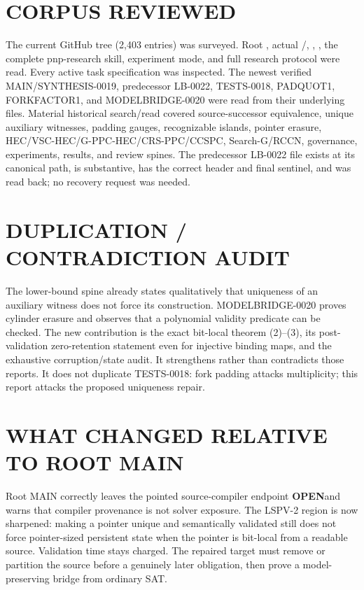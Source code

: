 \documentclass[11pt]{article}
\newcommand{\OPEN}{\textbf{OPEN}}
\begin{document}
\section{CORPUS REVIEWED}

The current GitHub tree (2,403 entries) was surveyed.  Root ,
actual /, ,
, the complete pnp-research skill, experiment mode, and full
research protocol were read.  Every active task specification was inspected.
The newest verified MAIN/SYNTHESIS-0019, predecessor LB-0022, TESTS-0018,
PADQUOT1, FORKFACTOR1, and MODELBRIDGE-0020 were read from their underlying
files.  Material historical search/read covered source-successor equivalence,
unique auxiliary witnesses, padding gauges, recognizable islands, pointer
erasure, HEC/VSC-HEC/G-PPC-HEC/CRS-PPC/CCSPC, Search-G/RCCN, governance,
experiments, results, and review spines.  The predecessor LB-0022 file exists
at its canonical path, is substantive, has the correct header and final
sentinel, and was read back; no recovery request was needed.

\section{DUPLICATION / CONTRADICTION AUDIT}

The lower-bound spine already states qualitatively that uniqueness of an
auxiliary witness does not force its construction.  MODELBRIDGE-0020 proves
cylinder erasure and observes that a polynomial validity predicate can be
checked.  The new contribution is the exact bit-local theorem (2)--(3), its
post-validation zero-retention statement even for injective binding maps, and
the exhaustive corruption/state audit.  It strengthens rather than
contradicts those reports.  It does not duplicate TESTS-0018: fork padding
attacks multiplicity; this report attacks the proposed uniqueness repair.

\section{WHAT CHANGED RELATIVE TO ROOT MAIN}

Root MAIN correctly leaves the pointed source-compiler endpoint \OPEN and
warns that compiler provenance is not solver exposure.  The LSPV-2 region is
now sharpened: making a pointer unique and semantically validated still does
not force pointer-sized persistent state when the pointer is bit-local from a
readable source.  Validation time stays charged.  The repaired target must
remove or partition the source before a genuinely later obligation, then
prove a model-preserving bridge from ordinary SAT.
\end{document}
